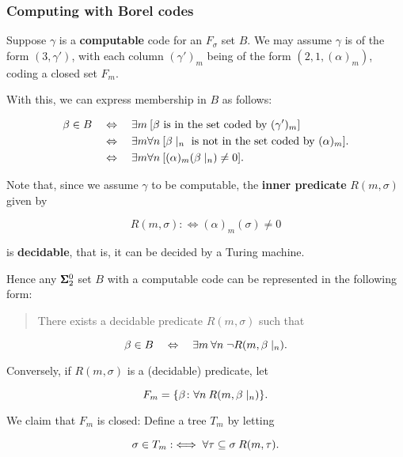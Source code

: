 \subsubsection{Computing with Borel codes}

Suppose $\gamma$ is a \textbf{computable} code for an $F_\sigma$ set $B$. We may assume $\gamma$ is of the form $(3,\gamma')$, with each column $(\gamma')_m$ being of the form $(2,1,(\alpha)_m)$, coding a closed set $F_m$.

With this, we can express membership in $B$ as follows:

\begin{align*}
    \beta \in B \quad & \Leftrightarrow \quad \exists m \: [\text{$\beta$ is in the set coded by $(\gamma')_m$}] \\
        & \Leftrightarrow \quad \exists m \forall n \: [\beta\mid_{n} \text{ is not in the set coded by } (\alpha)_m]. \\
        & \Leftrightarrow \quad \exists m \forall n \: [(\alpha)_m(\beta\mid_{n}) \neq 0 ].
\end{align*}

Note that, since we assume $\gamma$ to be computable, the \textbf{inner predicate} $R(m,\sigma)$ given by

\begin{equation}
R(m,\sigma) :\iff (\alpha)_m(\sigma) \neq 0
\end{equation}

is \textbf{decidable}, that is, it can be decided by a Turing machine.

Hence any $\pmb{\Sigma}^0_2$ set $B$ with a computable code can be represented in the following form:

\begin{quote}
There exists a decidable predicate $R(m,\sigma)$ such that
\end{quote}
\begin{equation*}
\beta \in B \quad \Leftrightarrow \quad \exists m \: \forall n \; \neg R(m, \beta\mid_{n}).
\end{equation*}

Conversely, if $R(m,\sigma)$ is a (decidable) predicate, let

\begin{equation}
F_m = \{ \beta \colon \forall n \: R(m,\beta\mid_{n}) \}.
\end{equation}

We claim that $F_m$ is closed: Define a tree $T_m$ by letting

\begin{equation}
\sigma \in T_m : \iff \forall \tau \subseteq \sigma \: R(m, \tau).
\end{equation}

